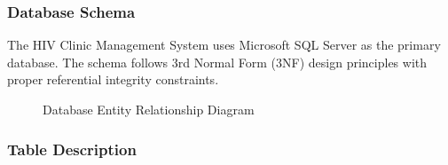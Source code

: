 \documentclass[12pt,a4paper]{article}
\begin{document}
\subsubsection{Database Schema}

The HIV Clinic Management System uses Microsoft SQL Server as the primary database. The schema follows 3rd Normal Form (3NF) design principles with proper referential integrity constraints.

\begin{figure}[H]
\centering
{}
\caption{Database Entity Relationship Diagram}
\label{fig:database-schema}
\end{figure}

\subsubsection{Table Description}
\end{document}
